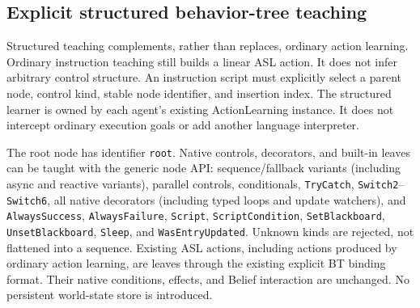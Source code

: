 \subsection{Explicit structured behavior-tree teaching}

Structured teaching complements, rather than replaces, ordinary action learning.
Ordinary instruction teaching still builds a linear ASL action. It does not infer
arbitrary control structure. An instruction script must explicitly select a
parent node, control kind, stable node identifier, and insertion index.
The structured learner is owned by each agent's existing ActionLearning instance.
It does not intercept ordinary execution goals or add another language interpreter.

The root node has identifier \texttt{root}. Native controls, decorators, and
built-in leaves can be taught with the generic node API:
sequence/fallback variants (including async and reactive variants), parallel
controls, conditionals, \texttt{TryCatch}, \texttt{Switch2}--\texttt{Switch6},
all native decorators (including typed loops and update watchers), and
\texttt{AlwaysSuccess}, \texttt{AlwaysFailure}, \texttt{Script},
\texttt{ScriptCondition}, \texttt{SetBlackboard}, \texttt{UnsetBlackboard},
\texttt{Sleep}, and \texttt{WasEntryUpdated}.
Unknown kinds are rejected, not flattened into a sequence.
Existing ASL actions, including actions produced by ordinary action learning,
are leaves through the existing explicit BT binding format.
Their native conditions, effects, and Belief interaction are unchanged.
No persistent world-state store is introduced.


